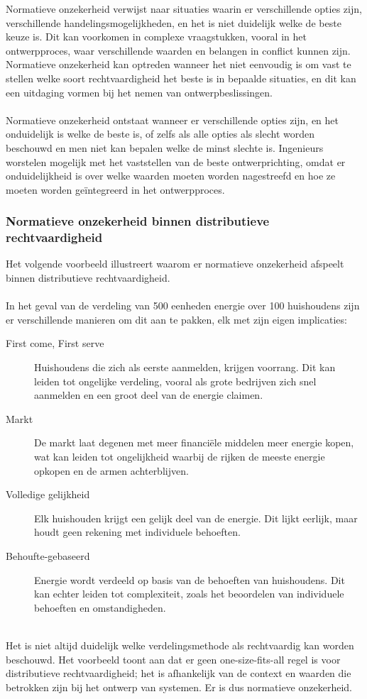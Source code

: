 \documentclass[../summary.tex]{subfiles}
\begin{document}
	Normatieve onzekerheid verwijst naar situaties waarin er verschillende opties zijn, verschillende handelingsmogelijkheden, en het is niet duidelijk welke de beste keuze is. Dit kan voorkomen in complexe vraagstukken, vooral in het ontwerpproces, waar verschillende waarden en belangen in conflict kunnen zijn. Normatieve onzekerheid kan optreden wanneer het niet eenvoudig is om vast te stellen welke soort rechtvaardigheid het beste is in bepaalde situaties, en dit kan een uitdaging vormen bij het nemen van ontwerpbeslissingen.\\
	\\
	Normatieve onzekerheid ontstaat wanneer er verschillende opties zijn, en het onduidelijk is welke de beste is, of zelfs als alle opties als slecht worden beschouwd en men niet kan bepalen welke de minst slechte is. Ingenieurs worstelen mogelijk met het vaststellen van de beste ontwerprichting, omdat er onduidelijkheid is over welke waarden moeten worden nagestreefd en hoe ze moeten worden geïntegreerd in het ontwerpproces.
	
	\subsubsection{Normatieve onzekerheid binnen distributieve rechtvaardigheid}
	
	Het volgende voorbeeld illustreert waarom er normatieve onzekerheid afspeelt binnen distributieve rechtvaardigheid. \\
	\\
	In het geval van de verdeling van 500 eenheden energie over 100 huishoudens zijn er verschillende manieren om dit aan te pakken, elk met zijn eigen implicaties:
	\begin{description}
		\item[First come, First serve] 	Huishoudens die zich als eerste aanmelden, krijgen voorrang. Dit kan leiden tot ongelijke verdeling, vooral als grote bedrijven zich snel aanmelden en een groot deel van de energie claimen.
		\item[Markt] De markt laat degenen met meer financiële middelen meer energie kopen, wat kan leiden tot ongelijkheid waarbij de rijken de meeste energie opkopen en de armen achterblijven.
		\item[Volledige gelijkheid] Elk huishouden krijgt een gelijk deel van de energie. Dit lijkt eerlijk, maar houdt geen rekening met individuele behoeften.
		\item[Behoufte-gebaseerd] Energie wordt verdeeld op basis van de behoeften van huishoudens. Dit kan echter leiden tot complexiteit, zoals het beoordelen van individuele behoeften en omstandigheden.
	\end{description}
	\ \\
	Het is niet altijd duidelijk welke verdelingsmethode als rechtvaardig kan worden beschouwd. Het voorbeeld toont aan dat er geen one-size-fits-all regel is voor distributieve rechtvaardigheid; het is afhankelijk van de context en waarden die betrokken zijn bij het ontwerp van systemen. Er is dus normatieve onzekerheid.
	
\end{document}
